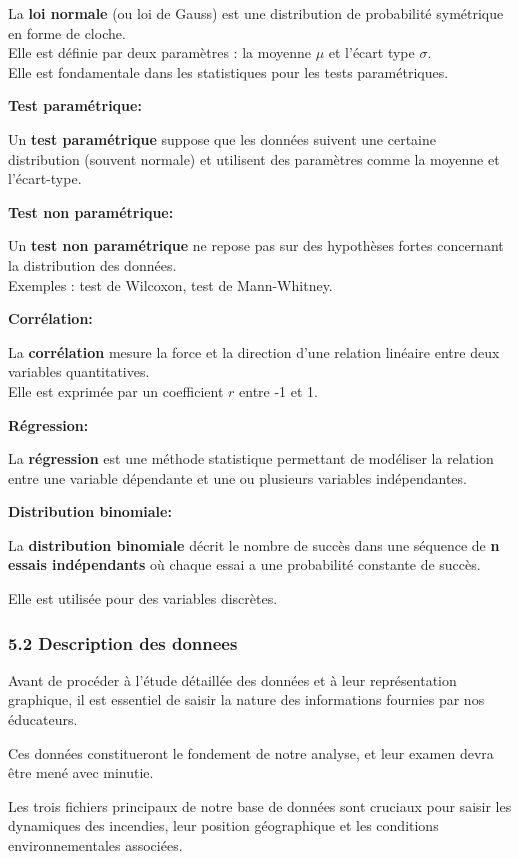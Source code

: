 \documentclass[
]{article}
\begin{document}
La \textbf{loi normale} (ou loi de Gauss) est une distribution de
probabilité symétrique en forme de cloche.\\
Elle est définie par deux paramètres : la moyenne \(\mu\) et l'écart
type \(\sigma\).\\
Elle est fondamentale dans les statistiques pour les tests
paramétriques.

\textbf{Test paramétrique:}

Un \textbf{test paramétrique} suppose que les données suivent une
certaine distribution (souvent normale) et utilisent des paramètres
comme la moyenne et l'écart-type.

\textbf{Test non paramétrique:}

Un \textbf{test non paramétrique} ne repose pas sur des hypothèses
fortes concernant la distribution des données.\\
Exemples : test de Wilcoxon, test de Mann-Whitney.

\textbf{Corrélation:}

La \textbf{corrélation} mesure la force et la direction d'une relation
linéaire entre deux variables quantitatives.\\
Elle est exprimée par un coefficient \(r\) entre -1 et 1.

\textbf{Régression:}

La \textbf{régression} est une méthode statistique permettant de
modéliser la relation entre une variable dépendante et une ou plusieurs
variables indépendantes.

\textbf{Distribution binomiale:}

La \textbf{distribution binomiale} décrit le nombre de succès dans une
séquence de \textbf{n essais indépendants} où chaque essai a une
probabilité constante de succès.

Elle est utilisée pour des variables discrètes.

\subsubsection{5.2 Description des
donnees}\label{description-des-donnees}

Avant de procéder à l'étude détaillée des données et à leur
représentation graphique, il est essentiel de saisir la nature des
informations fournies par nos éducateurs.

Ces données constitueront le fondement de notre analyse, et leur examen
devra être mené avec minutie.

Les trois fichiers principaux de notre base de données sont cruciaux
pour saisir les dynamiques des incendies, leur position géographique et
les conditions environnementales associées.
\end{document}
